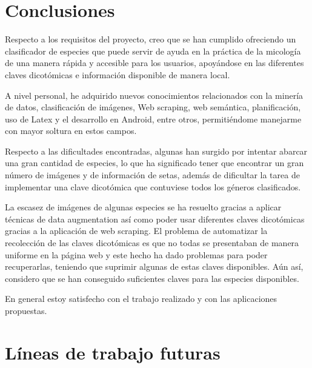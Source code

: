 


\section{Conclusiones}

Respecto a los requisitos del proyecto, creo que se han cumplido ofreciendo un clasificador de especies que puede servir de ayuda en la práctica de la micología de una manera rápida y accesible para los usuarios, apoyándose en las diferentes claves dicotómicas e información disponible de manera local.

A nivel personal, he adquirido nuevos conocimientos relacionados con la minería de datos, clasificación de imágenes, Web scraping, web semántica, planificación, uso de Latex y  el desarrollo en Android, entre otros, permitiéndome manejarme con mayor soltura en estos campos.

Respecto a las dificultades encontradas, algunas han surgido por intentar abarcar una gran cantidad de especies, lo que ha significado tener que encontrar un gran número de imágenes y de información de setas, además de dificultar la tarea de implementar una clave dicotómica que contuviese todos los géneros clasificados.

La escasez de imágenes de algunas especies se ha resuelto gracias a aplicar técnicas de data augmentation así como poder usar diferentes claves dicotómicas gracias a la aplicación de web scraping. El problema de automatizar la recolección de las claves dicotómicas es que no todas se presentaban de manera uniforme en la página web y este hecho ha dado problemas para poder recuperarlas, teniendo que suprimir algunas de estas claves disponibles. Aún así, considero que se han conseguido suficientes claves para las especies disponibles.

En general estoy satisfecho con el trabajo realizado y con las aplicaciones propuestas.

\section{Líneas de trabajo futuras}

